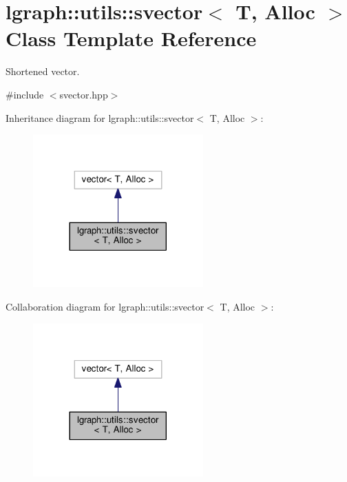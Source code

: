 \hypertarget{classlgraph_1_1utils_1_1svector}{}\section{lgraph\+:\+:utils\+:\+:svector$<$ T, Alloc $>$ Class Template Reference}
\label{classlgraph_1_1utils_1_1svector}


Shortened vector.  




{\ttfamily \#include $<$svector.\+hpp$>$}



Inheritance diagram for lgraph\+:\+:utils\+:\+:svector$<$ T, Alloc $>$\+:\nopagebreak
\begin{figure}[H]
\begin{center}
\leavevmode
\includegraphics[width=185pt]{classlgraph_1_1utils_1_1svector__inherit__graph}
\end{center}
\end{figure}


Collaboration diagram for lgraph\+:\+:utils\+:\+:svector$<$ T, Alloc $>$\+:\nopagebreak
\begin{figure}[H]
\begin{center}
\leavevmode
\includegraphics[width=185pt]{classlgraph_1_1utils_1_1svector__coll__graph}
\end{center}
\end{figure}
